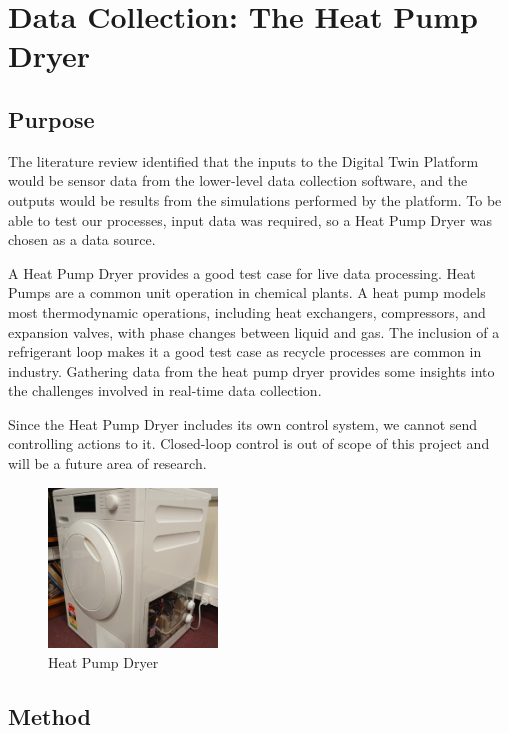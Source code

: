 \chapter{Data Collection: The Heat Pump Dryer} \label{sec:heatpumpcollection}

\section{Purpose}

The literature review identified that the inputs to the Digital Twin Platform would be sensor data from the lower-level data collection software, and the outputs would be results from  the simulations performed by the platform. To be able to test our processes, input data was required, so a Heat Pump Dryer was chosen as a data source.

A Heat Pump Dryer provides a good test case for live data processing. Heat Pumps are a common unit operation in chemical plants. A heat pump models most thermodynamic operations, including heat exchangers, compressors, and expansion valves, with phase changes between liquid and gas. 
The inclusion of a refrigerant loop makes it a good test case as recycle processes are common in industry. 
Gathering data from the heat pump dryer provides some insights into the challenges involved in real-time data collection.

Since the Heat Pump Dryer includes its own control system, we cannot send controlling actions to it. Closed-loop control is out of scope of this project and will be a future area of research.

\begin{figure}
    \centering
    \includegraphics[width=0.4\textwidth]{dryer.png}
    \caption{Heat Pump Dryer}
    \label{fig:dryer}
\end{figure}

\section{Method}


